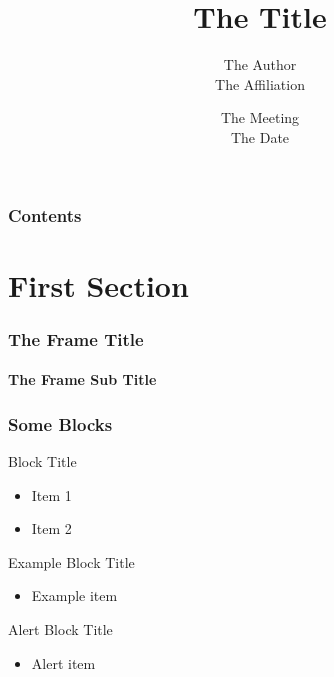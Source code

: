 \documentclass[final, hyperref={pdfpagemode=FullScreen}, aspectratio=169]{beamer}
\title[author@cern.ch]{The Title}
\author{The Author\\The Affiliation}
\date[Meeting Abbrev]{The Meeting\\The Date}
\begin{document}

\begin{frame}[label=titlepage]
  \centering
  \vspace{0.5cm}
  \resizebox{1.5cm}{!}{}
  \vspace{-0.5cm}

  \titlepage
\end{frame}


\begin{frame}[label=toc]
  \frametitle{Contents}

  \tableofcontents
\end{frame}


\section{First Section}


\begin{frame}
  \frametitle{The Frame Title}
  \framesubtitle{The Frame Sub Title}

\end{frame}


\begin{frame}
  \frametitle{Some Blocks}
  \small

  \begin{block}{\small Block Title}
    \begin{itemize}
      \item Item 1
      \item Item 2
    \end{itemize}
  \end{block}

  \begin{exampleblock}{\small Example Block Title}
    \begin{itemize}
      \item Example item
    \end{itemize}
  \end{exampleblock}

  \begin{alertblock}{\small Alert Block Title}
    \begin{itemize}
      \item Alert item
    \end{itemize}
  \end{alertblock}
\end{frame}
\end{document}
